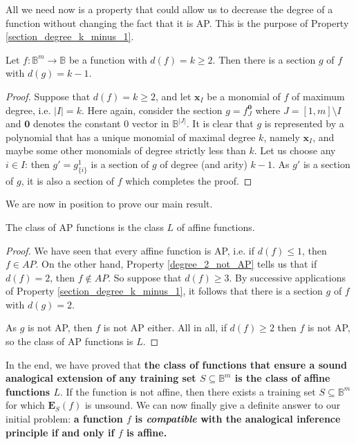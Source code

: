 All we need now is a property that could allow us to decrease the degree of a
function without changing the fact that it is AP. This is the purpose of
Property \ref{section_degree_k_minus_1}.

\begin{property}\label{section_degree_k_minus_1}
Let $f:\mathbb{B}^m\rightarrow \mathbb{B}$ be a function with
  $d(f)=k\geq 2$. Then there is a section $g$ of $f$ with $d(g)=k-1$.
\end{property}
\begin{proof}
Suppose that  $d(f)=k\geq 2$, and let $\mathbf{x}_I$ be a monomial of $f$ of
  maximum degree, i.e. $|I|=k$.  Here again, consider the section $g =
  f^{\mathbf{0}}_J$ where $J = [1, m] \setminus I$ and $\mathbf{0}$ denotes the
  constant $0$ vector in $\mathbb{B}^{|J|}$. It is clear that $g$ is
  represented by a  polynomial that has a unique monomial of maximal degree
  $k$, namely $\mathbf{x}_I$, and maybe some other monomials of degree strictly
  less than $k$.  Let us choose any $i \in I$: then $g' = g^1_{\{i\}}$ is a
  section of $g$ of degree (and arity) $k-1$. As $g'$ is a section of $g$, it
  is also a section of $f$ which completes the proof.
\end{proof}

We are now in position to prove our main result.

\begin{proposition}
  \label{PROPOS:AP_is_L}
The class of AP functions is the class $L$ of affine functions.
\end{proposition}
\begin{proof}
We have seen that every affine function is AP, i.e. if $d(f)\leq 1$, then $f\in
  AP$. On the other hand, Property \ref{degree_2_not_AP} tells us that if
  $d(f)=2$, then $f \notin AP$. So suppose that  $d(f)\geq 3$. By successive
  applications of Property \ref{section_degree_k_minus_1}, it follows that
  there is a section $g$ of $f$ with $d(g)=2$.

  As $g$ is not AP, then $f$ is not AP either. All in all, if $d(f) \geq 2$
  then $f$ is not AP, so the class of AP functions is $L$.
\end{proof}

In the end, we have proved that {\bf the class of functions that ensure a sound
analogical extension of any training set $S \subseteq \mathbb{B}^m$ is the class
of affine functions $L$}. If the function is not affine, then there exists a
training set $S \subseteq \mathbb{B}^m$ for which $\mathbf{E}_S(f)$ is unsound.
We can now finally give a definite answer to our initial problem: \textbf{a
function $f$ is \textit{compatible} with the analogical inference principle if
and only if $f$ is affine.}


